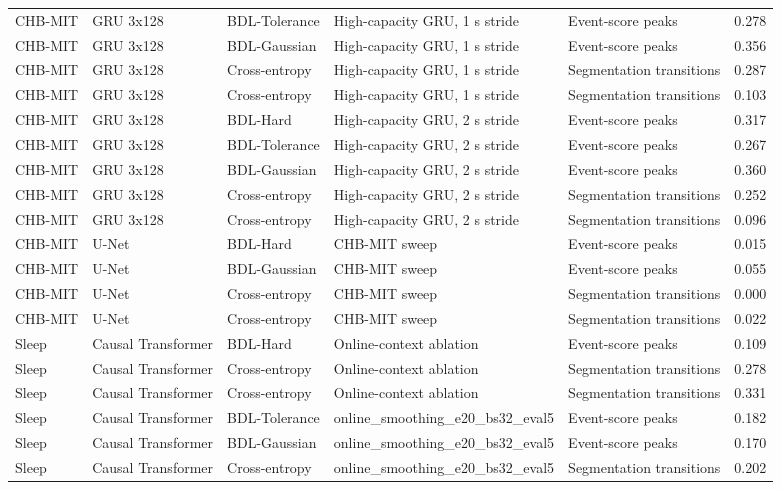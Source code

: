 \begin{tabular}{llllll}
CHB-MIT & GRU 3x128 & BDL-Tolerance & High-capacity GRU, 1 s stride & Event-score peaks & 0.278 \\
CHB-MIT & GRU 3x128 & BDL-Gaussian & High-capacity GRU, 1 s stride & Event-score peaks & 0.356 \\
CHB-MIT & GRU 3x128 & Cross-entropy & High-capacity GRU, 1 s stride & Segmentation transitions & 0.287 \\
CHB-MIT & GRU 3x128 & Cross-entropy & High-capacity GRU, 1 s stride & Segmentation transitions & 0.103 \\
CHB-MIT & GRU 3x128 & BDL-Hard & High-capacity GRU, 2 s stride & Event-score peaks & 0.317 \\
CHB-MIT & GRU 3x128 & BDL-Tolerance & High-capacity GRU, 2 s stride & Event-score peaks & 0.267 \\
CHB-MIT & GRU 3x128 & BDL-Gaussian & High-capacity GRU, 2 s stride & Event-score peaks & 0.360 \\
CHB-MIT & GRU 3x128 & Cross-entropy & High-capacity GRU, 2 s stride & Segmentation transitions & 0.252 \\
CHB-MIT & GRU 3x128 & Cross-entropy & High-capacity GRU, 2 s stride & Segmentation transitions & 0.096 \\
CHB-MIT & U-Net & BDL-Hard & CHB-MIT sweep & Event-score peaks & 0.015 \\
CHB-MIT & U-Net & BDL-Gaussian & CHB-MIT sweep & Event-score peaks & 0.055 \\
CHB-MIT & U-Net & Cross-entropy & CHB-MIT sweep & Segmentation transitions & 0.000 \\
CHB-MIT & U-Net & Cross-entropy & CHB-MIT sweep & Segmentation transitions & 0.022 \\
Sleep & Causal Transformer & BDL-Hard & Online-context ablation & Event-score peaks & 0.109 \\
Sleep & Causal Transformer & Cross-entropy & Online-context ablation & Segmentation transitions & 0.278 \\
Sleep & Causal Transformer & Cross-entropy & Online-context ablation & Segmentation transitions & 0.331 \\
Sleep & Causal Transformer & BDL-Tolerance & online\_smoothing\_e20\_bs32\_eval5 & Event-score peaks & 0.182 \\
Sleep & Causal Transformer & BDL-Gaussian & online\_smoothing\_e20\_bs32\_eval5 & Event-score peaks & 0.170 \\
Sleep & Causal Transformer & Cross-entropy & online\_smoothing\_e20\_bs32\_eval5 & Segmentation transitions & 0.202 \\

\end{tabular}
